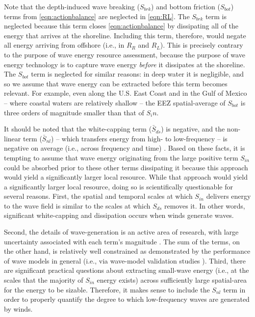 Note that the depth-induced wave breaking ($S_{brk}$) and bottom friction ($S_{bot}$) terms from \eqref{eqn:actionbalance} are neglected in \eqref{eqn:RL}.
The $S_{brk}$ term is neglected because this term closes \eqref{eqn:actionbalance} by dissipating all  of the energy that arrives at the shoreline. Including this term, therefore, would negate all energy arriving from offshore (i.e., in $R_R$ and $R_L$). This is precisely contrary to the purpose of wave energy resource assessment, because the purpose of wave energy technology is to capture wave energy {\it before} it dissipates at the shoreline. The $S_{bot}$ term is neglected for similar reasons: in deep water it is negligible, and so we assume that wave energy can be extracted before this term becomes relevant. For example, even along the U.S. East Coast and in the Gulf of Mexico -- where coastal waters are relatively shallow -- the EEZ spatial-average of $S_{bot}$ is three orders of magnitude smaller than that of $S_in$.

It should be noted that the white-capping term ($\bar{S}_{ds}$) is negative, and the non-linear term ($\bar{S}_{nl}$) -- which transfers energy from high- to low-frequency -- is negative on average (i.e., across frequency and time) . 
Based on these facts, it is tempting to assume that wave energy originating from the large positive term $S_{in}$ could be absorbed prior to these other terms dissipating it because this approach would yield a significantly larger local resource. While that approach would yield a significantly larger local resource, doing so is scientifically questionable for several reasons. First, the spatial and temporal scales at which $S_{in}$ delivers energy to the wave field is similar to the scales at which $S_{ds}$ removes it. In other words, significant white-capping and dissipation occurs when winds generate waves.

Second, the details of wave-generation is an active area of research, with large uncertainty associated with each term's magnitude \citep[e.g.,][]{garcia-medinaWaveResourceAssessment2014}. The sum of the terms, on the other hand, is relatively well constrained as demonstrated by the performance of wave models in general (i.e., via wave-model validation studies ). Third, there are significant practical questions about extracting small-wave energy (i.e., at the scales that the majority of $S_{in}$ energy exists) across sufficiently large spatial-area for the energy to be sizable. Therefore, it makes sense to include the $S_{nl}$ term in order to properly quantify the degree to which low-frequency waves are generated by winds.

